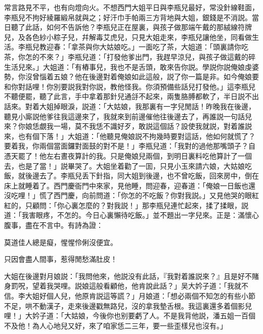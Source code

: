 常言路見不平，也有向燈向火。不想西門大姐平日與李瓶兒最好，常没針線鞋面，李瓶兒不拘好綾羅緞帛就與之；好汗巾手帕兩三方背地與大姐，銀錢是不消説。當日聽了此話，如何不告訴他？李瓶兒正在屋裏，與孩子做那端午戴的那絨線符牌兒，及各色紗小粽子兒，幷解毒艾虎兒，只見大姐走來，李瓶兒讓他坐，同看做生活。李瓶兒教迎春：「拿茶與你大姑娘吃。」一面吃了茶，大姐道：「頭裏請你吃茶，你怎的不來？」李瓶兒道：「打發他爹出門，我趕早涼兒，與孩子做這戴的碎生活兒來。」大姐道：「有樁事兒，我也不是舌頭，敢來告你説。學説你説俺娘虔婆勢，你沒曾惱着五娘？他在後邊對着俺娘如此這般，説了你一篇是非。如今俺娘要和你對話哩！你別要説我對你説，教他怪我。你須預備些話兒打發他。」這李瓶兒不聽便罷，聽了此言，手中拿着那針兒通㧱不起來，兩隻胳膊都軟了，半日説不出話來。對着大姐掉眼淚，説道：「大姑娘，我那裏有一字兒閒話！昨晚我在後邊，聽見小廝説他爹往我這邊來了，我就來到前邊催他往後邊去了，再誰説一句話兒來？你娘恁覷我一場，莫不我恁不識好歹，敢説這個話？設使我就説，對着誰説來，也有個下落！」大姐道：「他聽見俺娘説不拘幾時要對這話，他如何就慌了？要着我，你兩個當面鑼對面鼓的對不是！」李瓶兒道：「我對的過他那嘴頭子？自憑天罷了！他左右晝夜算計的我。只是俺娘兒兩個，到明日裏料吃他算計了一個去，也是了當！」説畢哭了。大姐坐着勸了一囬，只見小玉來請六娘，大姑娘吃飯，就後邊去了。李瓶兒丢下針指，同大姐到後邊，也不曾吃飯，回來房中，倒在床上就睡着了。西門慶衙門中來家，見他睡，問迎春，迎春道：「俺娘一日飯也還沒吃哩！」慌了西門慶，向前問道：「你怎的不吃飯？你對我説。」又見他哭的眼紅紅的，只顧問：「你心裏怎麼的？對我説！」那李瓶兒連忙起來，揉了揉眼，説道：「我害眼疼，不怎的。今日心裏懶待吃飯。」並不題出一字兒來。正是：滿懷心腹事，盡在不言中。有詩為證：

莫道佳人總是癡，惺惺伶俐沒便宜。

只因會盡人間事，惹得閒愁滿肚皮！

大姐在後邊對月娘説：「我問他來，他説没有此話，『我對着誰説來？』且是好不賭身罰呪，望着我哭哩。説娘這般看顧他，他肯說此話？」吴大妗子道：「我就不信。李大姐好個人兒，他原肯説這等謊？」月娘道：「想必兩個不知怎的有些小節不足，哄不動漢子，走來後邊戳無路兒，沒的拿我墊舌根。我這裏還多着個影兒哩！」大妗子道：「大姑娘，今後你也别要虧了人。不是我背他説，潘五姐一百個不及他！為人心地兒又好，來了咱家恁二三年，要一些歪樣兒也沒有。」

